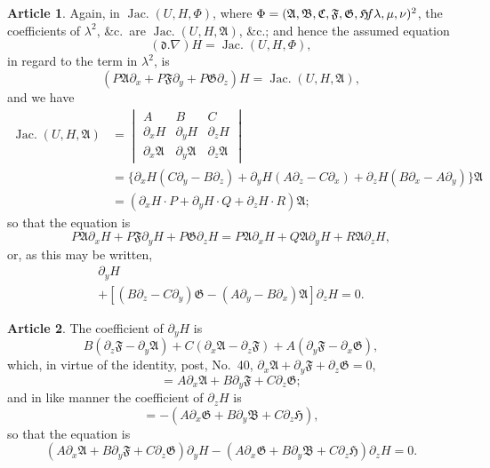 \documentclass[12pt,a4paper]{article}
\theoremstyle{definition}
\newtheorem{art}{Article}[section]
\DeclareMathOperator{\Jac}{Jac.}
\begin{document}
\begin{art}
Again, in $\Jac(U, H, \Phi)$, where $\Phi = (\mathfrak{A}, \mathfrak{B}, \mathfrak{C}, \mathfrak{F}, \mathfrak{G}, \mathfrak{H} \hspace{-2pt} f\lambda, \mu, \nu)^2$, the coefficients of $\lambda^2$, \&c.\ are $\Jac(U, H, \mathfrak{A})$, \&c.; and hence the assumed equation
\[
(\mathfrak{d}.\nabla)H = \Jac(U, H, \Phi),
\]
in regard to the term in $\lambda^2$, is
\[
(P\mathfrak{A}\partial_x + P\mathfrak{F}\partial_y + P\mathfrak{G}\partial_z)H = \Jac(U, H, \mathfrak{A}),
\]
and we have
\begin{align*}
\Jac(U, H, \mathfrak{A}) &= \begin{vmatrix} A & B & C \\ \partial_x H & \partial_y H & \partial_z H \\ \partial_x\mathfrak{A} & \partial_y\mathfrak{A} & \partial_z\mathfrak{A} \end{vmatrix} \\
&= \{\partial_x H(C\partial_y - B\partial_z) + \partial_y H(A\partial_z - C\partial_x) + \partial_z H(B\partial_x - A\partial_y)\}\mathfrak{A} \\
&= (\partial_x H \cdot P + \partial_y H \cdot Q + \partial_z H \cdot R)\mathfrak{A};
\end{align*}
so that the equation is
\[
P\mathfrak{A}\partial_x H + P\mathfrak{F}\partial_y H + P\mathfrak{G}\partial_z H = P\mathfrak{A}\partial_x H + Q\mathfrak{A}\partial_y H + R\mathfrak{A}\partial_z H,
\]
or, as this may be written,
\begin{multline*}
[(B\partial_z - C\partial_y)\mathfrak{F} - (C\partial_x - A\partial_z)\mathfrak{A}]\partial_y H \\
+ [(B\partial_z - C\partial_y)\mathfrak{G} - (A\partial_y - B\partial_x)\mathfrak{A}]\partial_z H = 0.
\end{multline*}
\end{art}

\begin{art}
The coefficient of $\partial_y H$ is
\[
B(\partial_z\mathfrak{F} - \partial_y\mathfrak{A}) + C(\partial_x\mathfrak{A} - \partial_z\mathfrak{F}) + A(\partial_y\mathfrak{F} - \partial_x\mathfrak{G}),
\]
which, in virtue of the identity, post, No.~40, $\partial_x\mathfrak{A} + \partial_y\mathfrak{F} + \partial_z\mathfrak{G} = 0$,
\[
= A\partial_x\mathfrak{A} + B\partial_y\mathfrak{F} + C\partial_z\mathfrak{G};
\]
and in like manner the coefficient of $\partial_z H$ is
\[
= -(A\partial_x\mathfrak{G} + B\partial_y\mathfrak{B} + C\partial_z\mathfrak{H}),
\]
so that the equation is
\[
(A\partial_x\mathfrak{A} + B\partial_y\mathfrak{F} + C\partial_z\mathfrak{G})\partial_y H - (A\partial_x\mathfrak{G} + B\partial_y\mathfrak{B} + C\partial_z\mathfrak{H})\partial_z H = 0.
\]
\end{art}
\end{document}
